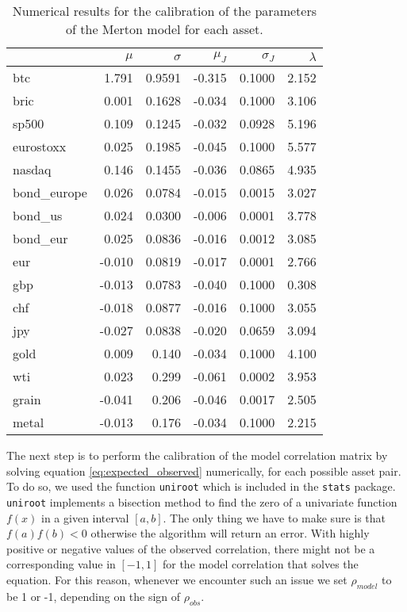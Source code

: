 \begin{table}
	\centering
	\caption{Numerical results for the calibration of the parameters of the Merton model for each asset.}
	\begin{tabular}{lrrrrr}
		& $\mu$ & $\sigma$ & $\mu_{J}$ & $\sigma_{J}$ & $\lambda$ \\
		\midrule
		btc & 1.791 & 0.9591 & -0.315 & 0.1000 & 2.152 \\
		bric & 0.001 & 0.1628 & -0.034 & 0.1000 & 3.106 \\
		sp500 & 0.109 & 0.1245 & -0.032 & 0.0928 & 5.196 \\
		eurostoxx & 0.025 & 0.1985 & -0.045 & 0.1000 & 5.577 \\
		nasdaq & 0.146 & 0.1455 & -0.036 & 0.0865 & 4.935 \\
		bond\_europe & 0.026 & 0.0784 & -0.015 & 0.0015 & 3.027 \\
		bond\_us & 0.024 & 0.0300 & -0.006 & 0.0001 & 3.778 \\
		bond\_eur & 0.025 & 0.0836 & -0.016 & 0.0012 & 3.085 \\
		eur & -0.010 & 0.0819 & -0.017 & 0.0001 & 2.766 \\
		gbp & -0.013 & 0.0783 & -0.040 & 0.1000 & 0.308 \\
		chf & -0.018 & 0.0877 & -0.016 & 0.1000 & 3.055 \\
		jpy & -0.027 & 0.0838 & -0.020 & 0.0659 & 3.094 \\
		gold & 0.009 & 0.140 & -0.034 & 0.1000 & 4.100 \\
		wti & 0.023 & 0.299 & -0.061 & 0.0002 & 3.953 \\
		grain & -0.041 & 0.206 & -0.046 & 0.0017 & 2.505 \\
		metal & -0.013 & 0.176 & -0.034 & 0.1000 & 2.215 \\
		\midrule
	\end{tabular}
\label{tab:merton_params}
\end{table}

The next step is to perform the calibration of the model correlation matrix by solving equation \eqref{eq:expected_observed} numerically, for each possible asset pair.
To do so, we used the function \texttt{uniroot} which is included in the \texttt{stats} package. \texttt{uniroot} implements a bisection method to find the zero of a univariate function $f(x)$ in a given interval $[a,b]$. The only thing we have to make sure is that $f(a)f(b)< 0 $ otherwise the algorithm will return an error.
With highly positive or negative values of the observed correlation, there might not be a corresponding value in $[-1,1]$ for the model correlation that solves the equation. For this reason, whenever we encounter such an issue we set $\rho_{model}$ to be 1 or -1, depending on the sign of $\rho_{obs}$.


